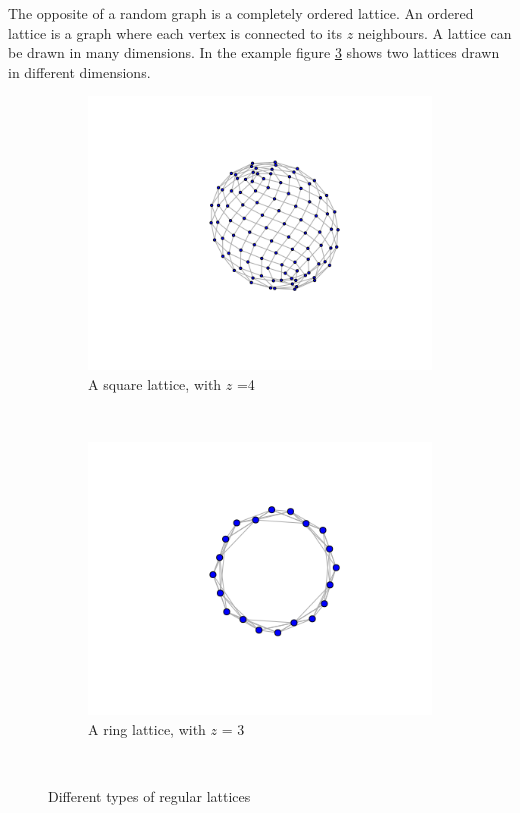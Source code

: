 The opposite of a random graph is a completely ordered lattice. An ordered lattice is a graph where each vertex is connected to its $z$ neighbours. A lattice can be drawn in many dimensions. In the example figure \ref{fig2222} shows two lattices drawn in different dimensions.
\begin{figure}[h!]
    \centering
    \begin{subfigure}[b]{0.4\textwidth}
        \includegraphics[scale=0.6]{images/lattice1.png} 
        \caption{A square lattice, with $z$ =4}
        \label{fig:gull}
    \end{subfigure}
    ~ %
    \begin{subfigure}[b]{0.4\textwidth}
        \includegraphics[scale=0.6]{images/ringlattice.png} 
        \caption{A ring lattice, with $z$ = 3}
        \label{fig ring}
    \end{subfigure}
    ~ %
    \caption{Different types of regular lattices}\label{fig2222}
\end{figure}



